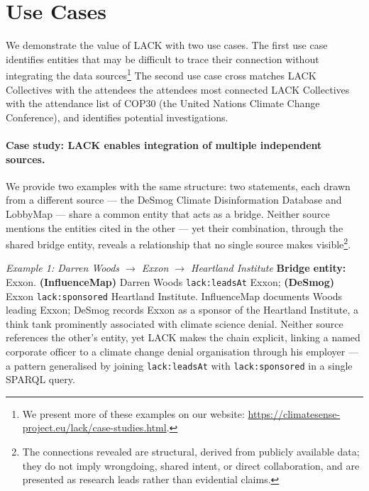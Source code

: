\vspace{-0.3cm}\section{Use Cases}
\label{sec:usecase}
We demonstrate the value of LACK with two use cases. 
The first use case identifies entities that may be difficult to trace their connection without integrating the data sources\footnote{We present more of these examples on our website: \url{https://climatesense-project.eu/lack/case-studies.html}.}
The second use case cross matches LACK Collectives with the attendees the attendees
most connected LACK Collectives with the attendance list of COP30 (the United Nations Climate Change Conference), and identifies potential investigations.
\begin{sloppypar}
\paragraph{Case study: LACK enables integration of multiple independent sources.} 
We provide two examples with the same structure: two statements, each drawn from a different source — the DeSmog Climate Disinformation Database and LobbyMap — share a common entity that acts as a bridge. 
Neither source mentions the entities cited in the other — yet their combination, through the shared bridge entity, reveals a relationship that no single source makes visible\footnote{The connections revealed are structural, derived from publicly available data; they do not imply wrongdoing, shared intent, or direct collaboration, and are presented as research leads rather than evidential claims.}.

\textit{Example 1: Darren Woods $\rightarrow$ Exxon $\rightarrow$ Heartland Institute}
\noindent\textbf{Bridge entity:} Exxon. \textbf{(InfluenceMap)} Darren Woods \texttt{lack:leadsAt} Exxon; \textbf{(DeSmog)} Exxon \texttt{lack:sponsored} Heartland Institute.
InfluenceMap documents Woods leading Exxon; DeSmog records Exxon as a sponsor of the Heartland Institute, a think tank prominently associated with climate science denial.
Neither source references the other's entity, yet LACK makes the chain explicit, linking a named corporate officer to a climate change denial organisation through his employer --- a pattern generalised by joining \texttt{lack:leadsAt} with \texttt{lack:sponsored} in a single SPARQL query.


\end{sloppypar}
